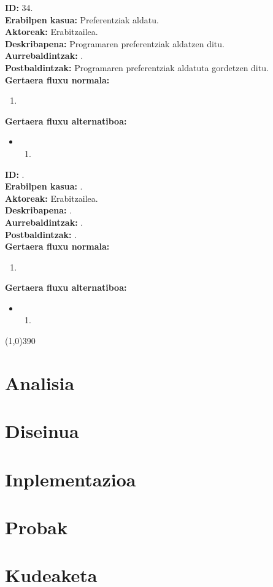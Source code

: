 \noindent
\textbf{ID:} 34.\\
\textbf{Erabilpen kasua:} Preferentziak aldatu.\\
\textbf{Aktoreak:} Erabitzailea.\\
\textbf{Deskribapena:} Programaren preferentziak aldatzen ditu.\\
\textbf{Aurrebaldintzak:} .\\
\textbf{Postbaldintzak:} Programaren preferentziak aldatuta gordetzen ditu.\\
\textbf{Gertaera fluxu normala:}
\begin{enumerate}
	\item
\end{enumerate}
\textbf{Gertaera fluxu alternatiboa:}
\begin{itemize}
	\item 
		\begin{enumerate}
		\item
		\end{enumerate}
\end{itemize}

\noindent
\textbf{ID:} .\\
\textbf{Erabilpen kasua:} .\\
\textbf{Aktoreak:} Erabitzailea.\\
\textbf{Deskribapena:} .\\
\textbf{Aurrebaldintzak:} .\\
\textbf{Postbaldintzak:} .\\
\textbf{Gertaera fluxu normala:}
\begin{enumerate}
	\item
\end{enumerate}
\textbf{Gertaera fluxu alternatiboa:}
\begin{itemize}
	\item 
		\begin{enumerate}
		\item
		\end{enumerate}
\end{itemize}

\line(1,0){390}

\section{Analisia}

\section{Diseinua}

\section{Inplementazioa}

\section{Probak}

\section{Kudeaketa}